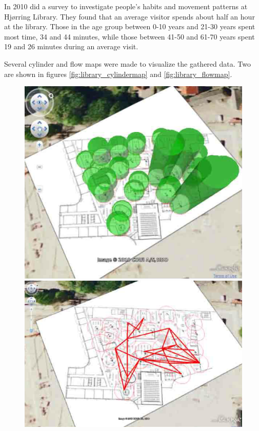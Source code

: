 
In 2010 \citep{hjoerring_study} did a survey to investigate people's habits and movement patterns at Hj{\o}rring Library. They found that an average visitor spends about half an hour at the library. Those in the age group between 0-10 years and 21-30 years spent most time, 34 and 44 minutes, while those between 41-50 and 61-70 years spent 19 and 26 minutes during an average visit.

Several cylinder and flow maps were made to visualize the gathered data. Two are shown in figures \ref{fig:library_cylindermap} and \ref{fig:library_flowmap}.

\begin{figure}[htbp] \centering
\begin{minipage}[b]{0.45\textwidth} \centering
\includegraphics[width=1.00\textwidth]{Pictures/HjoerringLibrary/library_cylinder_diagram_24Nov.png} %
\end{minipage} \hfill
\begin{minipage}[b]{0.45\textwidth} \centering
\includegraphics[width=1.00\textwidth]{Pictures/HjoerringLibrary/library_flow_Nov21.png} %

\end{minipage}
\end{figure}
